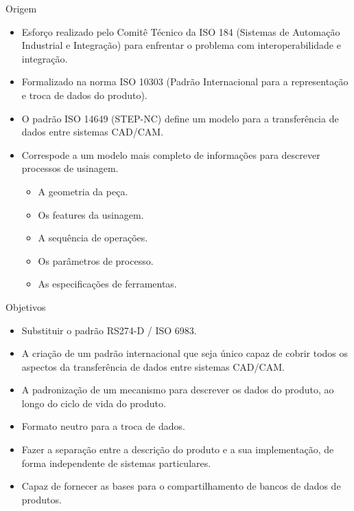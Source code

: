 \documentclass[aspectratio=169]{beamer}
\begin{document}
{\begin{frame}{Origem}
  \begin{itemize}
  \item {
    Esforço realizado pelo Comitê Técnico da ISO 184 (Sistemas de Automação Industrial e
    Integração) para enfrentar o problema com interoperabilidade e integração.
  }
  \item {
    Formalizado na norma ISO 10303 (Padrão Internacional para a representação e troca de dados do produto).
  }  
  \item {
    O padrão ISO 14649 (STEP-NC) define um modelo para a transferência de dados entre sistemas CAD/CAM.
  }
  \item {
    Correspode a um modelo mais completo de informações para descrever processos de usinagem.
    \begin{itemize}
      \item A geometria da peça.
      \item Os features da usinagem.
      \item A sequência de operações.
      \item Os parâmetros de processo.
      \item As especificações de ferramentas.
    \end{itemize}
  }
  \end{itemize}
\end{frame}


\begin{frame}{Objetivos}
  \begin{itemize}
    \item {
      Substituir o padrão RS274-D / ISO 6983.
    }
    \item{
      A criação de um padrão internacional que seja único capaz de cobrir todos os aspectos 
      da transferência de dados entre sistemas CAD/CAM.
    }
    \item {
      A padronização de um mecanismo para descrever os dados do produto, ao longo do ciclo de 
      vida do produto.
    }
    \item {
      Formato neutro para a troca de dados.
    }
    \item {
      Fazer a separação entre a descrição do produto e a sua implementação, 
      de forma independente de sistemas particulares.
    }
    \item {
      Capaz de fornecer as bases para o compartilhamento de bancos de dados de produtos.
    }
  \end{itemize}
\end{frame}


}
\end{document}
